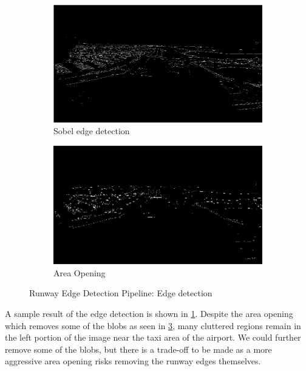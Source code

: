 \documentclass[letterpaper, conference]{IEEEtran}  %
\begin{document}
\begin{figure}
\centering
\begin{subfigure}{0.85 \textwidth}
	\includegraphics[width= \textwidth]{sobel.png} 
	\caption{\label{fig:sobel}  Sobel edge detection}
\end{subfigure}
\begin{subfigure}{0.85 \textwidth}
    \centering
	\includegraphics[width= \textwidth]{sobel_open.png} 
	\caption{\label{fig:sobelopen}Area Opening}
\end{subfigure}
\caption{Runway Edge Detection Pipeline: Edge detection}
\end{figure}

A sample result of the edge detection is shown in \cref{fig:sobel}. Despite the area opening which removes some of the blobs as seen in \cref{fig:sobelopen}, many cluttered regions remain in the left portion of the image near the taxi area of the airport. We could further remove some of the blobs, but there is a trade-off to be made as a more aggressive area opening risks removing the runway edges themselves. 

\newpage
\end{document}
